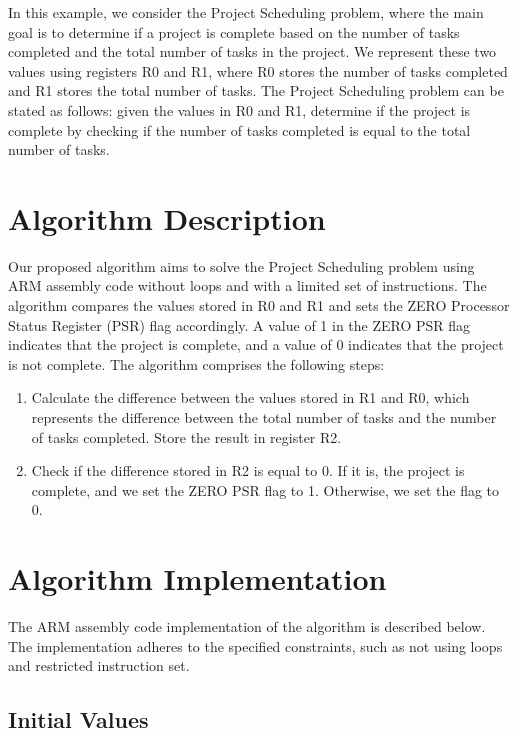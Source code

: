 In this example, we consider the Project Scheduling problem, where the main goal is to determine if a project is complete based on the number of tasks completed and the total number of tasks in the project. We represent these two values using registers R0 and R1, where R0 stores the number of tasks completed and R1 stores the total number of tasks. The Project Scheduling problem can be stated as follows: given the values in R0 and R1, determine if the project is complete by checking if the number of tasks completed is equal to the total number of tasks.

\section{Algorithm Description}

Our proposed algorithm aims to solve the Project Scheduling problem using ARM assembly code without loops and with a limited set of instructions. The algorithm compares the values stored in R0 and R1 and sets the ZERO Processor Status Register (PSR) flag accordingly. A value of 1 in the ZERO PSR flag indicates that the project is complete, and a value of 0 indicates that the project is not complete. The algorithm comprises the following steps:

\begin{enumerate}
    \item Calculate the difference between the values stored in R1 and R0, which represents the difference between the total number of tasks and the number of tasks completed. Store the result in register R2.
    \item Check if the difference stored in R2 is equal to 0. If it is, the project is complete, and we set the ZERO PSR flag to 1. Otherwise, we set the flag to 0.
\end{enumerate}

\section{Algorithm Implementation}

The ARM assembly code implementation of the algorithm is described below. The implementation adheres to the specified constraints, such as not using loops and restricted instruction set.

\subsection{Initial Values}

